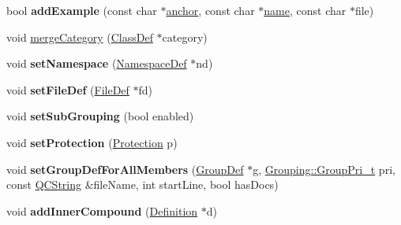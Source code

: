 \begin{DoxyCompactItemize}
\item 
\hypertarget{class_class_def_a6465272004bda4a4c659a6a2814154ee}{bool {\bfseries add\-Example} (const char $\ast$\hyperlink{class_class_def_acd17ae1d9600f864b1beb85dfb99a4f4}{anchor}, const char $\ast$\hyperlink{class_definition_a2c310e06c9aadc6fb218f80fcbb5c695}{name}, const char $\ast$file)}\label{class_class_def_a6465272004bda4a4c659a6a2814154ee}

\item 
void \hyperlink{class_class_def_a6c95a685fad4c9f730fed037fae718e3}{merge\-Category} (\hyperlink{class_class_def}{Class\-Def} $\ast$category)
\item 
\hypertarget{class_class_def_a77ef7c03d7ab9059874406ccceb110e8}{void {\bfseries set\-Namespace} (\hyperlink{class_namespace_def}{Namespace\-Def} $\ast$nd)}\label{class_class_def_a77ef7c03d7ab9059874406ccceb110e8}

\item 
\hypertarget{class_class_def_aaf99d2e7b4d7431a00fe3e970bc7f6e8}{void {\bfseries set\-File\-Def} (\hyperlink{class_file_def}{File\-Def} $\ast$fd)}\label{class_class_def_aaf99d2e7b4d7431a00fe3e970bc7f6e8}

\item 
\hypertarget{class_class_def_a13399806d6ed5cf731b3a67d8be20c23}{void {\bfseries set\-Sub\-Grouping} (bool enabled)}\label{class_class_def_a13399806d6ed5cf731b3a67d8be20c23}

\item 
\hypertarget{class_class_def_a6cc19181f99433807b136683170b37d0}{void {\bfseries set\-Protection} (\hyperlink{types_8h_a90e352184df58cd09455fe9996cd4ded}{Protection} p)}\label{class_class_def_a6cc19181f99433807b136683170b37d0}

\item 
\hypertarget{class_class_def_adb8b90408ea61ceefa9d635a2f13b429}{void {\bfseries set\-Group\-Def\-For\-All\-Members} (\hyperlink{class_group_def}{Group\-Def} $\ast$g, \hyperlink{struct_grouping_ae0be00a2b5dfbbc6c4558e88dddc9d81}{Grouping\-::\-Group\-Pri\-\_\-t} pri, const \hyperlink{class_q_c_string}{Q\-C\-String} \&file\-Name, int start\-Line, bool has\-Docs)}\label{class_class_def_adb8b90408ea61ceefa9d635a2f13b429}

\item 
\hypertarget{class_class_def_a98509b9197b57394494196e01c70e540}{void {\bfseries add\-Inner\-Compound} (\hyperlink{class_definition}{Definition} $\ast$d)}\label{class_class_def_a98509b9197b57394494196e01c70e540}


\end{DoxyCompactItemize}
